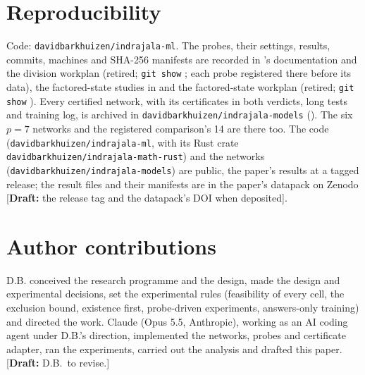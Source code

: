 \documentclass[11pt]{article}
\newcommand{\draftnote}[1]{\textcolor{red!70!black}{[\textbf{Draft:} #1]}}
\begin{document}
\section{Reproducibility}

Code: \texttt{davidbarkhuizen/indrajala-ml}. The probes, their settings, results, commits, machines
and SHA-256 manifests are recorded in 's documentation and
the division workplan (retired; \texttt{git show} ; each probe registered there before its data), the factored-state
studies in  and the factored-state workplan (retired; \texttt{git show} ).
Every certified network, with its certificates in both verdicts, long tests and training log, is
archived in \texttt{davidbarkhuizen/indrajala-models} ().
The six $p = 7$ networks and the registered comparison's 14 are there too.
The code (\texttt{davidbarkhuizen/indrajala-ml}, with its Rust crate
\texttt{davidbarkhuizen/indrajala-math-rust}) and the networks
(\texttt{davidbarkhuizen/indrajala-models}) are public, the paper's results at a tagged release;
the result files and their manifests are in the paper's datapack on Zenodo \draftnote{the release
tag and the datapack's DOI when deposited}.

\section*{Author contributions}
D.B. conceived the research programme and the design, made the design and experimental decisions,
set the experimental rules (feasibility of every cell, the exclusion bound, existence first,
probe-driven experiments, answers-only training) and directed the work. Claude (Opus 5.5,
Anthropic), working as an AI coding agent under D.B.'s direction, implemented the networks, probes
and certificate adapter, ran the experiments, carried out the analysis and drafted this paper.
\draftnote{D.B.\ to revise.}



\end{document}
